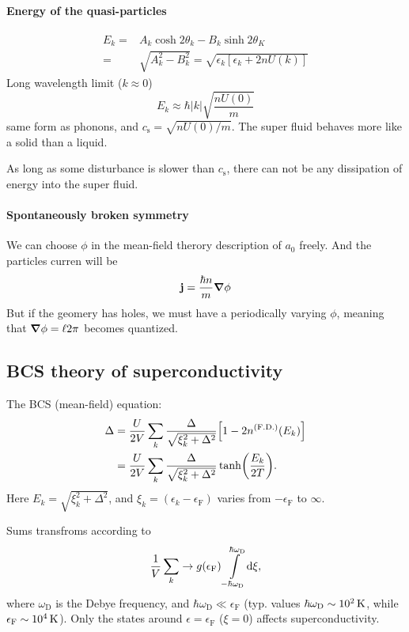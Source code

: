 \documentclass[11pt,letter, swedish, english, twocolumn
]{article}
\newcommand{\eF}{\ensuremath{{\epsilon_{\text{F}}}}}
\newcommand{\cs}{\ensuremath{{c_{\text{s}}}}}
\newcommand{\wD}{\ensuremath{{\omega_{\text{D}}}}}
\begin{document}
\paragraph{Energy of the quasi-particles}
\begin{equation}
\begin{aligned}
E_k=&A_k\cosh2\theta_k-B_k\sinh2\theta_K\\
=&\sqrt{A_k^2-B_k^2}=\sqrt{\epsilon_k[\epsilon_k+2nU(k)]}
\end{aligned}
\end{equation}
Long wavelength limit ($k\approx0$)
\begin{equation}
E_k\approx\hbar|k|\sqrt{\frac{nU(0)}{m}}
\end{equation}
same form as phonons, and $\cs=\sqrt{nU(0)/m}$. The super fluid
behaves more like a solid than a liquid. 

As long as some disturbance is slower than $\cs$, there can not be any
dissipation of energy into the super fluid. 

\paragraph{Spontaneously broken symmetry}
We can choose $\phi$ in the mean-field therory description of $a_0$
freely. And the particles curren will be
\begin{equation}
\vb{j}=\frac{\hbar n}{m} \grad\phi
\end{equation}
But if the geomery has holes, we must have a periodically varying
$\phi$, meaning that $\grad\phi=\ell2\pi$ becomes quantized.


\subsection{BCS theory of superconductivity}
The BCS (mean-field) equation:
\begin{equation}
\begin{aligned}
\Delta &= \frac{U}{2V}\sum_k \frac{\Delta}{\sqrt{\xi_k^2+\Delta^2}}
\qty[1-2n^{(\text{F.D.})}(E_k)]\\
&= \frac{U}{2V}\sum_k \frac{\Delta}{\sqrt{\xi_k^2+\Delta^2}}
\tanh(\frac{E_k}{2T}).
\end{aligned}
\end{equation}
Here $E_k=\sqrt{\xi_k^2+\Delta^2}$, and $\xi_k=(\epsilon_k-\eF)$ varies
from $-\eF$ to $\infty$.

Sums transfroms according to
\begin{equation}
\frac{1}{V}\sum_k \to g(\eF)\int_{-\hbar\wD}^{\hbar\wD}\!\rd\xi,
\end{equation}
where $\wD$ is the Debye frequency, and $\hbar\wD\ll\eF$ (typ. values
$\hbar\wD\sim\unit[10^2]{K}$, while $\eF\sim\unit[10^4]{K}$). Only the
states around $\epsilon=\eF$ ($\xi=0$) affects superconductivity. 
\end{document}
